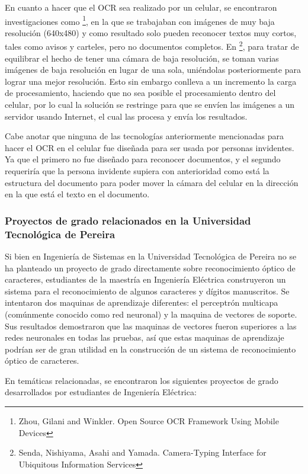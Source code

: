 \documentclass[a4paper, 11pt, oneside]{article}
\begin{document}
	En cuanto a hacer que el OCR sea realizado por un celular, se encontraron investigaciones
	como \footnote{Zhou, Gilani and Winkler. Open Source OCR Framework Using Mobile Devices}, 
	en la que se trabajaban con imágenes de muy baja resolución (640x480) y como resultado solo
    pueden reconocer textos muy cortos, tales como avisos y carteles, pero no documentos completos.
	En \footnote{Senda, Nishiyama, Asahi and Yamada. Camera-Typing Interface for Ubiquitous
	Information Services}, para tratar de equilibrar el hecho de tener una cámara de baja
	resolución, se toman varias imágenes de baja resolución en lugar de una sola, uniéndolas
	posteriormente para lograr una mejor resolución. Esto sin embargo conlleva a un incremento la
	carga de procesamiento, haciendo que no sea posible el procesamiento dentro del celular,
	por lo cual la solución se restringe para que se envíen las imágenes a un servidor usando 
    Internet, el cual las procesa y envía los resultados.

	Cabe anotar que ninguna de las tecnologías anteriormente mencionadas para hacer
	el OCR en el celular fue diseñada para ser usada por personas invidentes. Ya que el 
	primero no fue diseñado para reconocer documentos, y el segundo requeriría que la persona
	invidente supiera con anterioridad como está la estructura del documento para poder mover
	la cámara del celular en la dirección en la que está el texto en el documento.
	
	\subsubsection{Proyectos de grado relacionados en la Universidad Tecnológica de Pereira}
	Si bien en Ingeniería de Sistemas en la Universidad Tecnológica de Pereira no se ha planteado un 
    proyecto de grado directamente sobre reconocimiento óptico de caracteres, estudiantes de la 
    maestría en Ingeniería Eléctrica construyeron un sistema para el reconocimiento de algunos 
    caracteres y dígitos manuscritos. Se intentaron dos maquinas de aprendizaje diferentes:
	el perceptrón multicapa (comúnmente conocido como red neuronal) y la maquina de vectores de
	soporte. Sus resultados demostraron que las maquinas de vectores fueron superiores a las redes
    neuronales en todas las pruebas, así que estas maquinas de aprendizaje podrían ser de gran 
    utilidad en la construcción de un sistema de reconocimiento óptico de caracteres.
    
	En temáticas relacionadas, se encontraron los siguientes proyectos de grado desarrollados por 
    estudiantes de Ingeniería Eléctrica:
    
\end{document}
